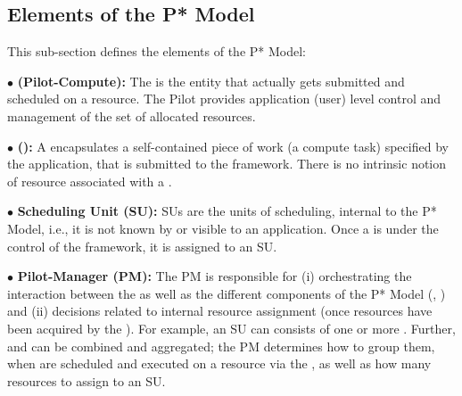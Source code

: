 \documentclass[conference]{IEEEtran}
\begin{document}


%

\noindent 
\subsection{Elements of the P* Model}

\noindent This sub-section defines the elements of the P* Model:

\noindent$\bullet$ \textbf{\pilot (Pilot-Compute):} The \pilot is the
entity that actually gets submitted and scheduled on a resource.  The
Pilot provides
application (user) level control and management of the set of
allocated resources.



\noindent$\bullet$ \textbf{\computeunit  (\cu):} A \cu  encapsulates a 
  self-contained piece of work (a compute task) specified by the application, that is
  submitted to the \pilotjob framework. There is no intrinsic notion
  of resource associated with a \cu.

\noindent$\bullet$ \textbf{Scheduling Unit (SU):} SUs are the units of 
  scheduling, internal to the P* Model, i.e., it is not known by or
  visible to an application. Once a \cu is
  under the control of the \pilotjob framework, it is assigned
  to an SU.

\noindent$\bullet$ \textbf{Pilot-Manager (PM):} The PM is responsible for (i)
  orchestrating the interaction between the \pilots as well as the
  different components of the P* Model (\cus, \sus) and (ii) decisions
  related to internal resource assignment (once resources have been
  acquired by the \pilotjob).  For example, an SU can consists of one
  or more \cus. Further, \cus and \sus can be combined and aggregated;
  the PM determines how to group them, when \sus are scheduled and
  executed on a resource via the \pilot, as well as how many resources
  to assign to an SU.
\end{document}
